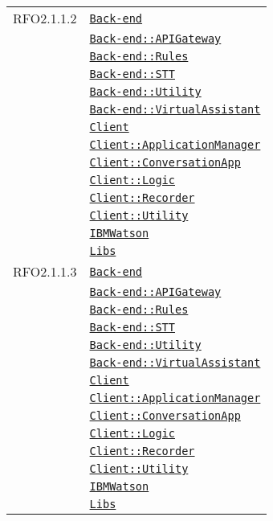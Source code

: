 \begin{longtable}{|>{\centering}m{3cm}|m{10cm}<{\centering}|}
RFO2.1.1.2 & \hyperref[Back-end]{\texttt{Back-end}}\\
& \hyperref[Back-end::APIGateway]{\texttt{Back-end::APIGateway}}\\
& \hyperref[Back-end::Rules]{\texttt{Back-end::Rules}}\\
& \hyperref[Back-end::STT]{\texttt{Back-end::STT}}\\
& \hyperref[Back-end::Utility]{\texttt{Back-end::Utility}}\\
& \hyperref[Back-end::VirtualAssistant]{\texttt{Back-end::VirtualAssistant}}\\
& \hyperref[Client]{\texttt{Client}}\\
& \hyperref[Client::ApplicationManager]{\texttt{Client::ApplicationManager}}\\
& \hyperref[Client::ConversationApp]{\texttt{Client::ConversationApp}}\\
& \hyperref[Client::Logic]{\texttt{Client::Logic}}\\
& \hyperref[Client::Recorder]{\texttt{Client::Recorder}}\\
& \hyperref[Client::Utility]{\texttt{Client::Utility}}\\
& \hyperref[IBMWatson]{\texttt{IBMWatson}}\\
& \hyperref[Libs]{\texttt{Libs}}\\ \hline

RFO2.1.1.3 & \hyperref[Back-end]{\texttt{Back-end}}\\
& \hyperref[Back-end::APIGateway]{\texttt{Back-end::APIGateway}}\\
& \hyperref[Back-end::Rules]{\texttt{Back-end::Rules}}\\
& \hyperref[Back-end::STT]{\texttt{Back-end::STT}}\\
& \hyperref[Back-end::Utility]{\texttt{Back-end::Utility}}\\
& \hyperref[Back-end::VirtualAssistant]{\texttt{Back-end::VirtualAssistant}}\\
& \hyperref[Client]{\texttt{Client}}\\
& \hyperref[Client::ApplicationManager]{\texttt{Client::ApplicationManager}}\\
& \hyperref[Client::ConversationApp]{\texttt{Client::ConversationApp}}\\
& \hyperref[Client::Logic]{\texttt{Client::Logic}}\\
& \hyperref[Client::Recorder]{\texttt{Client::Recorder}}\\
& \hyperref[Client::Utility]{\texttt{Client::Utility}}\\
& \hyperref[IBMWatson]{\texttt{IBMWatson}}\\
& \hyperref[Libs]{\texttt{Libs}}\\ \hline


\end{longtable}
